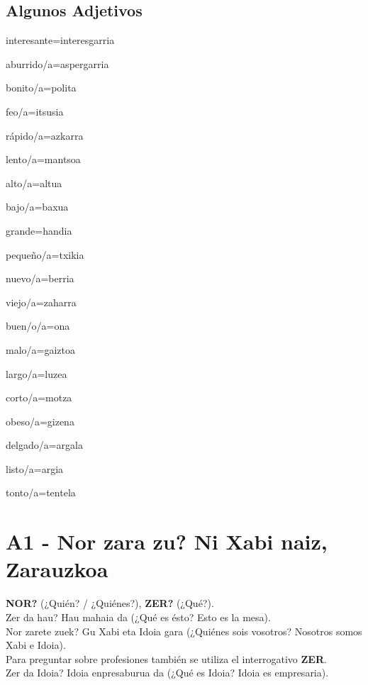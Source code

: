 \documentclass[11pt, a4paper]{article}
\begin{document}
\subsection{Algunos Adjetivos}
\begin{itemize}
\begin{multicols}{2}
\item interesante=interesgarria
\item aburrido/a=aspergarria
\item bonito/a=polita
\item feo/a=itsusia
\item rápido/a=azkarra
\item lento/a=mantsoa
\item alto/a=altua
\item bajo/a=baxua
\item grande=handia
\item pequeño/a=txikia
\item nuevo/a=berria
\item viejo/a=zaharra
\item buen/o/a=ona
\item malo/a=gaiztoa
\item largo/a=luzea
\item corto/a=motza
\item obeso/a=gizena
\item delgado/a=argala
\item listo/a=argia
\item tonto/a=tentela
\end{multicols}
\end{itemize}

\section{A1 - Nor zara zu? Ni Xabi naiz, Zarauzkoa}
\textbf{NOR?} (¿Quién? / ¿Quiénes?), \textbf{ZER?} (¿Qué?).\\
\indent Zer da hau? Hau mahaia da (¿Qué es ésto? Esto es la mesa).\\
\indent Nor zarete zuek? Gu Xabi eta Idoia gara (¿Quiénes sois vosotros? Nosotros somos Xabi e Idoia).\\

\noindent Para preguntar sobre profesiones también se utiliza el interrogativo \textbf{ZER}.\\
\indent Zer da Idoia? Idoia enpresaburua da (¿Qué es Idoia? Idoia es empresaria).\\
\end{document}

